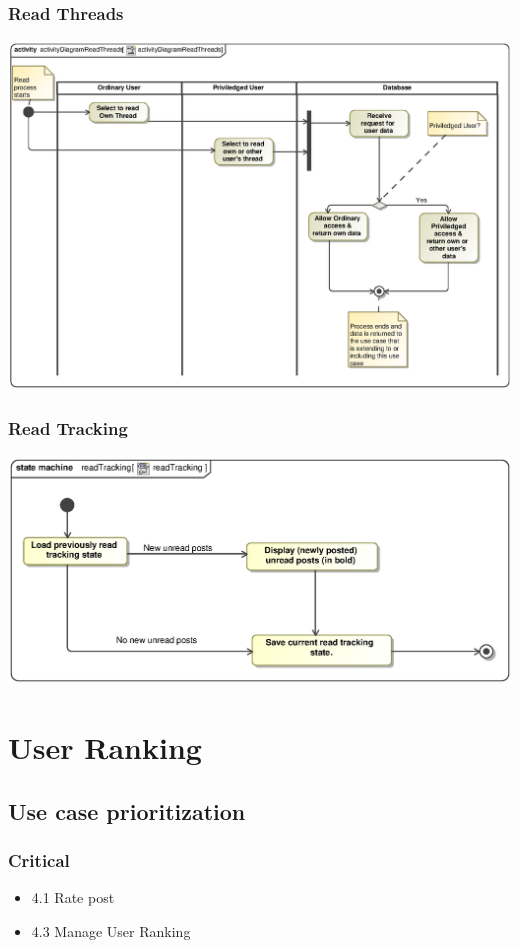 \documentclass[hidelinks, 12pt, oneside]{article}
\begin{document}
\subsubsection{Read Threads}
\includegraphics[scale=.9]{Andreas/activityDiagramReadThreads.eps}\\

\subsubsection{Read Tracking}
\includegraphics[scale=.9]{Andreas/stateDiagramreadTracking.eps}\\

\section{User Ranking}
\subsection{Use case prioritization}
\subsubsection{Critical}
\begin{itemize}
  \item 4.1 Rate post
  \item 4.3 Manage User Ranking
\end{itemize}
\end{document}
